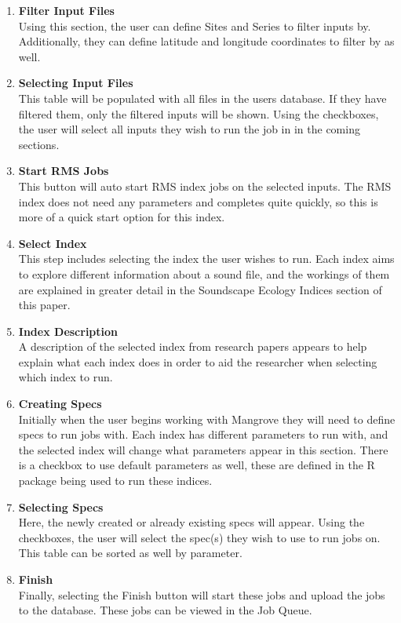 \begin{enumerate}
  \item \textbf{Filter Input Files}\\ Using this section, the user can define Sites and Series to filter inputs by. Additionally, they can define latitude and longitude coordinates to filter by as well.
  \item \textbf{Selecting Input Files}\\ This table will be populated with all files in the user\textquotesingle s database. If they have filtered them, only the filtered inputs will be shown. Using the checkboxes, the user will select all inputs they wish to run the job in in the coming sections.
  \item \textbf{Start RMS Jobs}\\ This button will auto start RMS index jobs on the selected inputs. The RMS index does not need any parameters and completes quite quickly, so this is more of a quick start option for this index.
  \item \textbf{Select Index}\\ This step includes selecting the index the user wishes to run. Each index aims to explore different information about a sound file, and the workings of them are explained in greater detail in the Soundscape Ecology Indices section of this paper.
  \item \textbf{Index Description}\\ A description of the selected index from research papers appears to help explain what each index does in order to aid the researcher when selecting which index to run.
  \item \textbf{Creating Specs}\\ Initially when the user begins working with Mangrove they will need to define specs to run jobs with. Each index has different parameters to run with, and the selected index will change what parameters appear in this section. There is a checkbox to use default parameters as well, these are defined in the R package being used to run these indices.
  \item \textbf{Selecting Specs}\\ Here, the newly created or already existing specs will appear. Using the checkboxes, the user will select the spec(s) they wish to use to run jobs on. This table can be sorted as well by parameter.
  \item \textbf{Finish}\\ Finally, selecting the Finish button will start these jobs and upload the jobs to the database. These jobs can be viewed in the Job Queue.
\end{enumerate}
